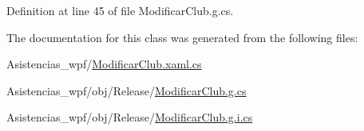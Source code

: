 Definition at line 45 of file Modificar\-Club.\-g.\-cs.



The documentation for this class was generated from the following files\-:\begin{DoxyCompactItemize}
\item 
Asistencias\-\_\-wpf/\hyperlink{_modificar_club_8xaml_8cs}{Modificar\-Club.\-xaml.\-cs}\item 
Asistencias\-\_\-wpf/obj/\-Release/\hyperlink{_modificar_club_8g_8cs}{Modificar\-Club.\-g.\-cs}\item 
Asistencias\-\_\-wpf/obj/\-Release/\hyperlink{_modificar_club_8g_8i_8cs}{Modificar\-Club.\-g.\-i.\-cs}\end{DoxyCompactItemize}
